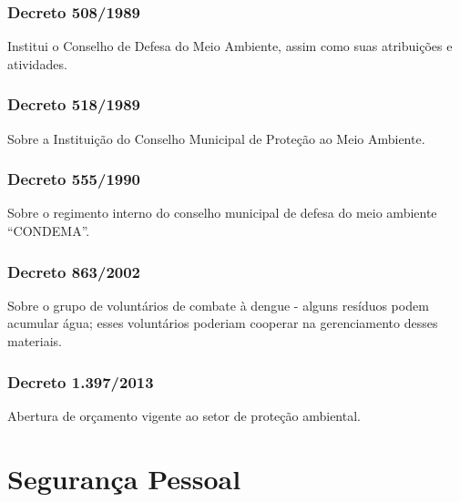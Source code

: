 \begin{subapend}
\begin{subsubapend}
		\subsubsection{Decreto 508/1989}
		Institui o Conselho de Defesa do Meio Ambiente, assim como suas atribuições e atividades.
		\subsubsection{Decreto 518/1989}
		Sobre a Instituição do Conselho Municipal de Proteção ao Meio Ambiente.
		\subsubsection{Decreto 555/1990}
		Sobre o regimento interno do conselho municipal de defesa do meio ambiente “CONDEMA”.
		\subsubsection{Decreto 863/2002}
		Sobre o grupo de voluntários de combate à dengue - alguns resíduos podem acumular água; esses voluntários poderiam cooperar na gerenciamento desses materiais.
		\subsubsection{Decreto 1.397/2013}
		Abertura de orçamento vigente ao setor de proteção ambiental.
	\end{subsubapend}
\end{subapend}

\section{Segurança Pessoal}

